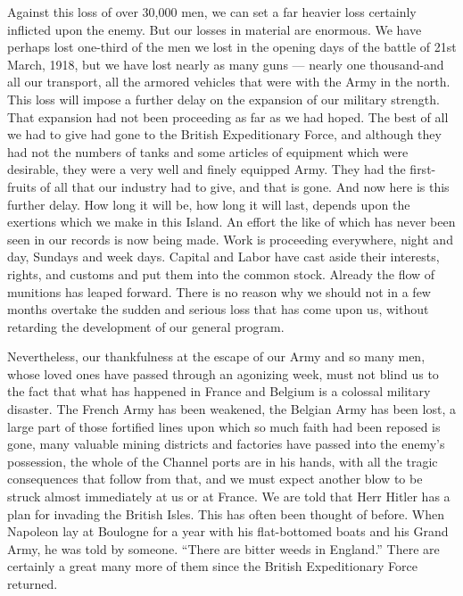 \documentclass[a4paper]{amsbook}
\begin{document}
Against this loss of over 30,000 men, we can set a far heavier loss certainly inflicted upon the enemy. But our losses in material are enormous. We have perhaps lost one-third of the men we lost in the opening days of the battle of 21st March, 1918, but we have lost nearly as many guns — nearly one thousand-and all our transport, all the armored vehicles that were with the Army in the north. This loss will impose a further delay on the expansion of our military strength. That expansion had not been proceeding as far as we had hoped. The best of all we had to give had gone to the British Expeditionary Force, and although they had not the numbers of tanks and some articles of equipment which were desirable, they were a very well and finely equipped Army. They had the first-fruits of all that our industry had to give, and that is gone. And now here is this further delay. How long it will be, how long it will last, depends upon the exertions which we make in this Island. An effort the like of which has never been seen in our records is now being made. Work is proceeding everywhere, night and day, Sundays and week days. Capital and Labor have cast aside their interests, rights, and customs and put them into the common stock. Already the flow of munitions has leaped forward. There is no reason why we should not in a few months overtake the sudden and serious loss that has come upon us, without retarding the development of our general program.

Nevertheless, our thankfulness at the escape of our Army and so many men, whose loved ones have passed through an agonizing week, must not blind us to the fact that what has happened in France and Belgium is a colossal military disaster. The French Army has been weakened, the Belgian Army has been lost, a large part of those fortified lines upon which so much faith had been reposed is gone, many valuable mining districts and factories have passed into the enemy's possession, the whole of the Channel ports are in his hands, with all the tragic consequences that follow from that, and we must expect another blow to be struck almost immediately at us or at France. We are told that Herr Hitler has a plan for invading the British Isles. This has often been thought of before. When Napoleon lay at Boulogne for a year with his flat-bottomed boats and his Grand Army, he was told by someone. “There are bitter weeds in England.” There are certainly a great many more of them since the British Expeditionary Force returned.
\end{document}
